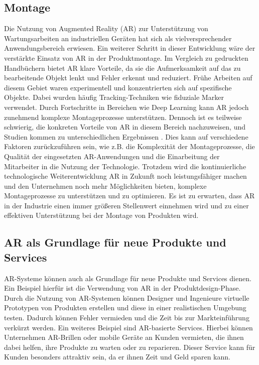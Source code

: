 \subsection{Montage}
Die Nutzung von Augmented Reality (AR) zur Unterstützung von Wartungsarbeiten
an industriellen Geräten hat sich als vielversprechender Anwendungsbereich
erwiesen. Ein weiterer Schritt in dieser Entwicklung wäre der verstärkte
Einsatz von AR in der Produktmontage. Im Vergleich zu gedruckten Handbüchern
bietet AR klare Vorteile, da sie die Aufmerksamkeit auf das zu bearbeitende
Objekt lenkt und Fehler erkennt und reduziert. Frühe Arbeiten auf diesem Gebiet
waren experimentell und konzentrierten sich auf spezifische Objekte. Dabei
wurden häufig Tracking-Techniken wie fiduziale Marker verwendet. Durch
Fortschritte in Bereichen wie Deep Learning kann AR jedoch zunehmend komplexe
Montageprozesse unterstützen. Dennoch ist es teilweise schwierig, die konkreten
Vorteile von AR in diesem Bereich nachzuweisen, und Studien kommen zu
unterschiedlichen Ergebnissen \cite{tang2003comparative}. Dies kann auf
verschiedene Faktoren zurückzuführen sein, wie z.B. die Komplexität der
Montageprozesse, die Qualität der eingesetzten AR-Anwendungen und die
Einarbeitung der Mitarbeiter in die Nutzung der Technologie.
Trotzdem wird die kontinuierliche technologische Weiterentwicklung AR in
Zukunft noch leistungsfähiger machen und den Unternehmen noch mehr
Möglichkeiten bieten, komplexe Montageprozesse zu unterstützen und zu
optimieren. Es ist zu erwarten, dass AR in der Industrie einen immer größeren
Stellenwert einnehmen wird und zu einer effektiven Unterstützung bei der
Montage von Produkten wird.\cite{8951930}

\subsection{AR als Grundlage für neue Produkte und Services}
AR-Systeme können auch als Grundlage für neue Produkte und Services dienen. Ein
Beispiel hierfür ist die Verwendung von AR in der Produktdesign-Phase. Durch
die Nutzung von AR-Systemen können Designer und Ingenieure virtuelle Prototypen
von Produkten erstellen und diese in einer realistischen Umgebung testen.
Dadurch können Fehler vermieden und die Zeit bis zur Markteinführung verkürzt
werden. Ein weiteres Beispiel sind AR-basierte Services. Hierbei können
Unternehmen AR-Brillen oder mobile Geräte an Kunden vermieten, die ihnen dabei
helfen, ihre Produkte zu warten oder zu reparieren. Dieser Service kann für
Kunden besonders attraktiv sein, da er ihnen Zeit und Geld sparen kann.

